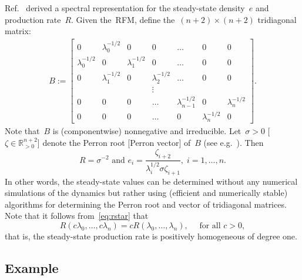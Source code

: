 Ref.~\cite{rfm_concave} derived a spectral representation for the steady-state density~$e$ and production rate~$R$. 
Given the~\ac{RFM}, define the~$(n+2)\times(n+2)$ tridiagonal matrix:
%
\begin{align} \label{rfm:matrix}
B :=\begin{bmatrix}
	0 &  \lambda_0^{-1/2}   & 0 &0 & \dots &0&0 \\
	\lambda_0^{-1/2} & 0 & \lambda_1^{-1/2}   & 0  & \dots &0&0 \\
	0& \lambda_1^{-1/2} & 0 &  \lambda_2^{-1/2}    & \dots &0&0 \\
	& &&\vdots \\
	0& 0 & 0 & \dots &\lambda_{n-1}^{-1/2}  & 0 & \lambda_{n }^{-1/2}     \\
	0& 0 & 0 & \dots & 0 & \lambda_{n  }^{-1/2}  & 0
\end{bmatrix}.
\end{align} 
%
Note that~$B$ is (componentwise) nonnegative and irreducible.
Let~$\sigma>0$ [$\zeta \in \mathbb R^{n+2}_{>0}$] denote the Perron root [Perron vector] of~$B$ (see e.g.~\cite{matrx_ana}). 
Then
%
\begin{equation}\label{eq:rstar}
	R=\sigma^{-2} \text{ and } 
	e_i=\frac{  \zeta_{i+2} }{  \lambda_{i }^{1/2}    \sigma     \zeta_{i+1} } , \; i=1,\dots,n. 
\end{equation}
%
In other words, the steady-state values can be determined without any numerical simulations of the dynamics but rather using (efficient and numerically stable) algorithms for determining the Perron root and vector of tridiagonal matrices. 
Note that it follows from~\eqref{eq:rstar} that   
\begin{equation}
	R(c\lambda_0,\dots,c\lambda_n)=cR(\lambda_0,\dots,\lambda_n),\quad \text{ for all }c>0,
\end{equation}
that is, the steady-state production rate is positively homogeneous of degree one.


\subsection{Example}
\label{rfm:example}

